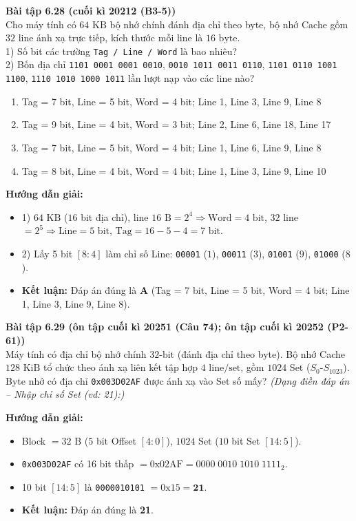 \textbf{Bài tập 6.28 (cuối kì 20212 (B3-5))}\\
Cho máy tính có $64\text{ KB}$ bộ nhớ chính đánh địa chỉ theo byte, bộ nhớ Cache gồm $32$ line ánh xạ trực tiếp, kích thước mỗi line là $16\text{ byte}$.\\
1) Số bit các trường \texttt{Tag / Line / Word} là bao nhiêu?\\
2) Bốn địa chỉ \texttt{1101 0001 0001 0010}, \texttt{0010 1011 0011 0110}, \texttt{1101 0110 1001 1100}, \texttt{1110 1010 1000 1011} lần lượt nạp vào các line nào?
\begin{enumerate}[label=\Alph*.]
    \item Tag = 7 bit, Line = 5 bit, Word = 4 bit; Line 1, Line 3, Line 9, Line 8
    \item Tag = 9 bit, Line = 4 bit, Word = 3 bit; Line 2, Line 6, Line 18, Line 17
    \item Tag = 7 bit, Line = 5 bit, Word = 4 bit; Line 1, Line 6, Line 9, Line 8
    \item Tag = 8 bit, Line = 4 bit, Word = 4 bit; Line 1, Line 3, Line 9, Line 10
\end{enumerate}
\textbf{Hướng dẫn giải:}
\begin{itemize}
    \item 1) $64\text{ KB}$ ($16$ bit địa chỉ), line $16\text{ B} = 2^4 \Rightarrow \text{Word} = 4\text{ bit}$, $32$ line $= 2^5 \Rightarrow \text{Line} = 5\text{ bit}$, $\text{Tag} = 16 - 5 - 4 = 7\text{ bit}$.
    \item 2) Lấy 5 bit $[8:4]$ làm chỉ số Line: \texttt{00001} ($1$), \texttt{00011} ($3$), \texttt{01001} ($9$), \texttt{01000} ($8$).
    \item \textbf{Kết luận:} Đáp án đúng là \textbf{A} (Tag = 7 bit, Line = 5 bit, Word = 4 bit; Line 1, Line 3, Line 9, Line 8).
\end{itemize}

\textbf{Bài tập 6.29 (ôn tập cuối kì 20251 (Câu 74); ôn tập cuối kì 20252 (P2-61))}\\
Máy tính có địa chỉ bộ nhớ chính $32\text{-bit}$ (đánh địa chỉ theo byte). Bộ nhớ Cache $128\text{ KiB}$ tổ chức theo ánh xạ liên kết tập hợp $4\text{ line/set}$, gồm $1024$ Set ($S_0\text{-}S_{1023}$). Byte nhớ có địa chỉ \texttt{0x003D02AF} được ánh xạ vào Set số mấy?
\textit{(Dạng điền đáp án -- Nhập chỉ số Set (vd: 21):)}\par
\textbf{Hướng dẫn giải:}
\begin{itemize}
    \item Block $= 32\text{ B}$ ($5$ bit Offset $[4:0]$), $1024$ Set ($10$ bit Set $[14:5]$).
    \item \texttt{0x003D02AF} có 16 bit thấp $= \text{0x02AF} = 0000\;0010\;1010\;1111_2$.
    \item 10 bit $[14:5]$ là \texttt{0000010101} $= \text{0x15} = \mathbf{21}$.
    \item \textbf{Kết luận:} Đáp án đúng là \textbf{21}.
\end{itemize}

